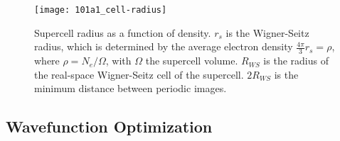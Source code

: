 \begin{figure}[h]
\centering
\texttt{[image: 101a1\_cell-radius]}
\caption{Supercell radius as a function of density. $r_s$ is the Wigner-Seitz radius, which is determined by the average electron density $\frac{4\pi}{3}r_s=\rho$, where $\rho=N_e/\Omega$, with $\Omega$ the supercell volume. $R_{WS}$ is the radius of the real-space Wigner-Seitz cell of the supercell. $2R_{WS}$ is the minimum distance between periodic images. \label{fig:cell-radius}}
\end{figure}

%
%

\subsection{Wavefunction Optimization}

